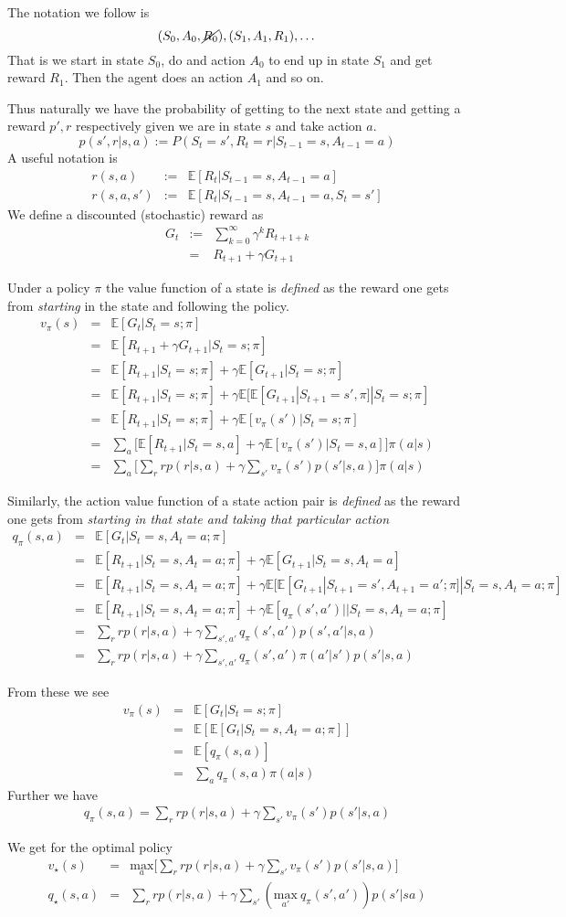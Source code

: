 \documentclass[11pt,a4paper]{article}
\newcommand\be{\begin{equation}}
\newcommand\bea{\begin{eqnarray}}
\newcommand\ee{\end{equation}}
\newcommand\eea{\end{eqnarray}}
\newcommand{\nn}{\nonumber \\}
\newcommand{\e}[1]{\mathbb E[#1]}
\begin{document}
The notation we follow is 
\be
(S_0,A_0,\cancel{R_0}),(S_1,A_1,R_1), \dots
\ee
That is we start in state $S_0$, do and action $A_0$ to end up in state $S_1$ and get reward $R_1$. Then the agent does an action $A_1$ and so on.

Thus naturally we have the probability of getting to the next state and getting a reward $p',r$ respectively given we are in state $s$ and take action $a$.
\be
p(s',r|s,a) := P(S_t=s',R_t=r|S_{t-1} = s,A_{t-1} = a)
\ee
A useful notation is
\bea
r(s,a) &:=& \e{R_t | S_{t-1}=s, A_{t-1}=a} \\
r(s,a,s') &:=& \e{R_t | S_{t-1}=s, A_{t-1}=a, S_t =s'}
\eea
We define a discounted (stochastic) reward as
\bea
G_t &:=& \sum_{k=0}^\infty \gamma^k R_{t+1+k} \nn
&=& R_{t+1} + \gamma G_{t+1}
\eea

Under a policy $\pi$ the value function of a state is {\em defined} as the reward one gets from {\em starting} in the state and following the policy.
\bea
v_\pi(s) &=& \e{G_t|S_t=s;\pi} \nn
&=& \e{R_{t+1} + \gamma G_{t+1} |S_t=s;\pi} \nn
&=& \e{R_{t+1}|S_t=s;\pi} + \gamma \e{G_{t+1}|S_t=s;\pi} \nn
&=& \e{R_{t+1}|S_t=s;\pi} + \gamma \e{\e{G_{t+1}|S_{t+1}=s',\pi}|S_t=s;\pi}  \nn
&=& \e{R_{t+1}|S_t=s;\pi} + \gamma \e{v_\pi(s') |S_t=s;\pi} \nn
&=& \sum_a \Bigg[\e{R_{t+1}|S_t=s,a} + \gamma \e{v_\pi(s') |S_t=s,a} \Bigg] \pi(a|s) \nn
&=& \sum_a \Bigg[\sum_r r p(r|s,a) + \gamma \sum_{s'} v_\pi(s') p(s'|s,a) \Bigg] \pi(a|s) 
\eea

Similarly, the action value function of a state action pair is {\em defined} as the reward one gets from {\em starting in that state and taking that particular action}
\bea
q_\pi(s,a) &=& \e{G_t | S_t=s,A_t=a;\pi} \nn
&=& \e{R_{t+1} |S_t=s,A_t=a;\pi} + \gamma \e{G_{t+1} | S_t=s, A_t=a} \nn
&=& \e{R_{t+1} |S_t=s,A_t=a;\pi} + \gamma \e{ \e{G_{t+1} | S_{t+1}=s',A_{t+1}=a';\pi}|S_t=s, A_t=a;\pi} \nn
&=& \e{R_{t+1} |S_t=s,A_t=a;\pi} + \gamma \e{ q_\pi(s',a')||S_t=s, A_t=a;\pi} \nn
&=& \sum_r r p(r|s,a) + \gamma \sum_{s',a'} q_\pi(s',a') p(s',a'|s,a) \nn
&=&  \sum_r r p(r|s,a) + \gamma \sum_{s',a'} q_\pi(s',a') \pi(a'|s') p(s'|s,a)
\eea

From these we see
\bea
v_\pi(s) &=&  \e{G_t|S_t=s;\pi} \nn
&=& \e{\e{G_t|S_t=s,A_t=a;\pi} } \nn
&=& \e{q_\pi(s,a)} \nn
&=& \sum_a q_\pi(s,a) \pi(a|s)
\eea
Further we have
\bea
q_\pi(s,a) = \sum_r r p(r|s,a) + \gamma \sum_{s'} v_\pi(s') p(s'|s,a)
\eea


We get for the optimal policy
\bea
v_\star(s) &=&\underset{a}{\text{max}}  \Bigg[\sum_r r p(r|s,a) + \gamma \sum_{s'} v_\pi(s') p(s'|s,a) \Bigg]  \\
q_\star(s,a) &=& \sum_r r p(r|s,a)  + \gamma \sum_{s'} \left( \underset{a'}{\text{max}} ~q_\pi(s',a') \right)p(s'|sa)
\eea
\end{document}
